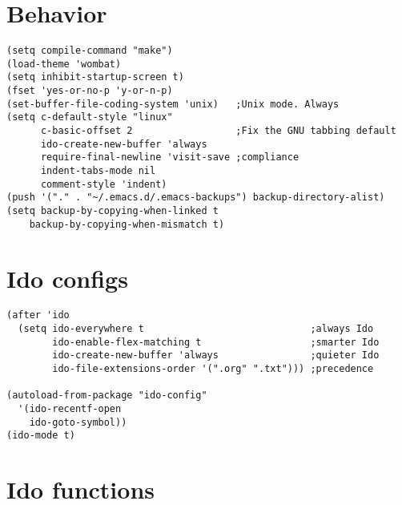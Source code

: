 \documentclass[11pt]{article}
\begin{document}
\section{Behavior}
\label{sec-5}


\begin{verbatim}
(setq compile-command "make")
(load-theme 'wombat)
(setq inhibit-startup-screen t)
(fset 'yes-or-no-p 'y-or-n-p)
(set-buffer-file-coding-system 'unix)   ;Unix mode. Always
(setq c-default-style "linux"
      c-basic-offset 2                  ;Fix the GNU tabbing default
      ido-create-new-buffer 'always
      require-final-newline 'visit-save ;compliance
      indent-tabs-mode nil
      comment-style 'indent)
(push '("." . "~/.emacs.d/.emacs-backups") backup-directory-alist)
(setq backup-by-copying-when-linked t
    backup-by-copying-when-mismatch t)
\end{verbatim}
\section{Ido configs}
\label{sec-6}


\begin{verbatim}
(after 'ido
  (setq ido-everywhere t                             ;always Ido
        ido-enable-flex-matching t                   ;smarter Ido
        ido-create-new-buffer 'always                ;quieter Ido
        ido-file-extensions-order '(".org" ".txt"))) ;precedence

(autoload-from-package "ido-config"
  '(ido-recentf-open
    ido-goto-symbol))
(ido-mode t)
\end{verbatim}
\section{Ido functions}
\label{sec-7}
\end{document}
